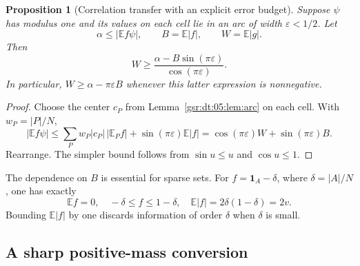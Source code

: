 \documentclass[11pt,letterpaper]{article}
\numberwithin{equation}{section}
\newtheorem{proposition}[theorem]{Proposition}
\theoremstyle{definition}
\theoremstyle{remark}
\newcommand{\E}{\mathbb E}
\newcommand{\one}{\mathbf 1}
\newcommand{\1}{\mathbf 1}
\newcommand{\eps}{\varepsilon}
\begin{document}
\begin{proposition}[Correlation transfer with an explicit error budget]
\label{gsr:dt:05:prop:transfer}
Suppose $\psi$ has modulus one and its values on each cell lie in an arc of width $\eps<1/2$. Let
\[
 \alpha\leq|\E f\psi|,\qquad B=\E|f|,\qquad W=\E|g|.
\]
Then
\begin{equation}
 W\geq\frac{\alpha-B\sin(\pi\eps)}{\cos(\pi\eps)}.
 \label{gsr:dt:05:eq:transfer-exact}
\end{equation}
In particular, $W\geq\alpha-\pi\eps B$ whenever this latter expression is nonnegative.
\end{proposition}
\begin{proof}
Choose the center $c_P$ from Lemma~\ref{gsr:dt:05:lem:arc} on each cell. With $w_P=|P|/N$,
\[
 |\E f\psi|\leq\sum_Pw_P|c_P|\,|\E_Pf|
                   +\sin(\pi\eps)\E|f|
 =\cos(\pi\eps)W+\sin(\pi\eps)B.
\]
Rearrange. The simpler bound follows from $\sin u\leq u$ and $\cos u\leq1$.
\end{proof}

The dependence on $B$ is essential for sparse sets. For $f=\one_A-\delta$, where $\delta=|A|/N$, one has exactly
\begin{equation}
 \E f=0,\quad -\delta\leq f\leq1-\delta,\quad
 \E|f|=2\delta(1-\delta)=2v.
 \label{gsr:dt:05:eq:balanced-mass}
\end{equation}
Bounding $\E|f|$ by one discards information of order $\delta$ when $\delta$ is small.

\subsection{A sharp positive-mass conversion}
\end{document}
